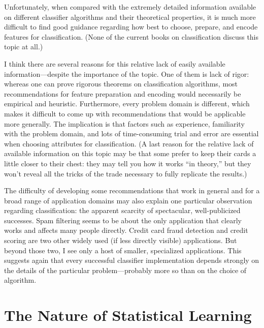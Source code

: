 Unfortunately, when compared with the extremely detailed information
available on different classifier algorithms and their theoretical
properties, it is much more difficult to find good guidance regarding
how best to choose, prepare, and encode features for classification.
(None of the current books on classification discuss this topic at
all.)

I think there are several reasons for this relative lack of easily
available information---\break despite the importance of the topic. One of
them is lack of rigor: whereas one can prove rigorous theorems on
classification algorithms, most recommendations for feature
preparation and encoding would necessarily be empirical and heuristic.
Furthermore, every problem domain is different, which makes it
difficult to come up with recommendations that would be applicable
more generally. The implication is that factors such as experience,
familiarity with the problem domain, and lots of time-consuming trial
and error are essential when\vadjust{\pagebreak} choosing attributes for
classification.  (A last reason for the relative lack of available
information on this topic may be that some prefer to keep their cards
a little closer to their chest: they may tell you how it works ``in
theory,'' but they won't reveal all the tricks of the trade necessary
to fully replicate the results.)

The difficulty of developing some recommendations that work in general
and for a broad range of application domains may also explain one
particular observation regarding classification:
the apparent scarcity of spectacular, well-publicized successes.  Spam
filtering seems to be about the only application that clearly works
and affects many people directly.  Credit card fraud detection and
credit scoring are two other widely used (if less directly visible)
applications. But beyond those two, I see only a host of smaller,
specialized applications. This suggests again that every successful
classifier implementation depends strongly on the details of the
particular problem---probably more so than on the choice of algorithm.


\spreadlong{-13pt}
\section{The Nature of Statistical Learning}

